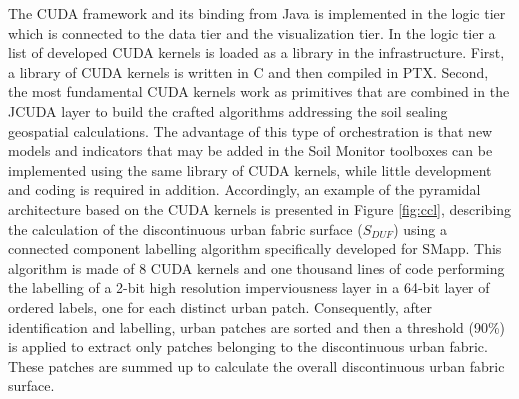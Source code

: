 \documentclass[APA,LATO1COL,doublespace]{WileyNJD-v2}
\begin{document}
The CUDA framework and its binding from Java is implemented in the logic tier which is connected to the data tier and the visualization tier.
In the logic tier a list of developed CUDA kernels is loaded as a library in the infrastructure. 
First, a library of CUDA kernels is written in C and then compiled in PTX. 
Second, the most fundamental CUDA kernels work as primitives that are combined in the JCUDA layer to build the crafted algorithms  addressing the soil sealing geospatial calculations. 
The advantage of this type of orchestration is that new models and indicators that may be added in the Soil Monitor toolboxes can be implemented using the same library of CUDA kernels, while little development and coding is required in addition. 
Accordingly, an example of the pyramidal architecture based on the CUDA kernels is presented in Figure \ref{fig:ccl}, describing the calculation of the discontinuous urban fabric surface ($S_{DUF}$) using a connected component labelling algorithm specifically developed for SMapp. 
This algorithm is made of 8 CUDA kernels and one thousand lines of code performing the labelling of a 2-bit high resolution imperviousness layer in a 64-bit layer of ordered labels, one for each distinct urban patch.
Consequently, after identification and labelling, urban patches are sorted and then a threshold (90\%) is applied to extract only patches belonging to the discontinuous urban fabric. 
These patches are summed up to calculate the overall discontinuous urban fabric surface.
\end{document}
